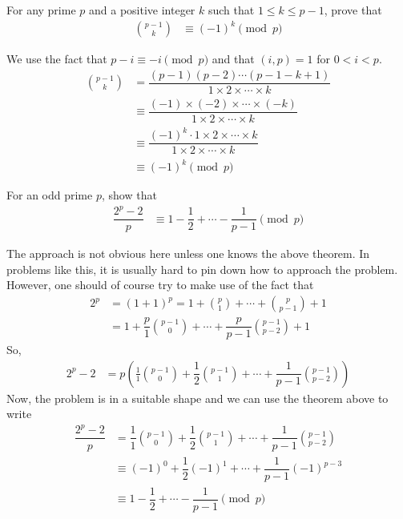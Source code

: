 \documentclass[12pt]{subfile}
\begin{document}
		\begin{problem}\label{prob:binom(p-1)(k)}
			For any prime $p$ and a positive integer $k$ such that $1 \leq k \leq p-1$, prove that
				\begin{align*}
					\binom{p-1}{k} & \equiv(-1)^k\pmod p
				\end{align*}
		\end{problem}

		\begin{solution}
			We use the fact that $p-i\equiv-i\pmod p$ and that $(i,p)=1$ for $0<i<p$.
				\begin{align*}
					\binom{p-1}{k}
						& = \dfrac{(p-1)(p-2)\cdots(p-1-k+1)}{1\times 2 \times \cdots \times k}\\
						& \equiv \dfrac{(-1) \times (-2) \times \cdots \times (-k)}{1\times 2 \times \cdots \times k}\\
						& \equiv\dfrac{(-1)^k \cdot 1\times 2 \times \cdots \times k}{1\times 2 \times \cdots \times k}\\
						& \equiv(-1)^k\pmod p
				\end{align*}

		\end{solution}

		\begin{problem}
			For an odd prime $p$, show that
				\begin{align*}
					\dfrac{2^p-2}{p} & \equiv1-\dfrac{1}{2}+\cdots-\dfrac{1}{p-1}\pmod p
				\end{align*}
		\end{problem}

		\begin{solution}
			The approach is not obvious here unless one knows the above theorem. In problems like this, it is usually hard to pin down how to approach the problem. However, one should of course try to make use of the fact that
				\begin{align*}
					2^p
						& = (1+1)^p = 1+\binom{p}{1}+\cdots+\binom{p}{p-1}+1\\
						& = 1+\dfrac{p}{1}\binom{p-1}{0}+\cdots+\dfrac{p}{p-1}\binom{p-1}{p-2}+1
				\end{align*}
			So,
				\begin{align*}
					2^p-2
						& = p\left(\frac{1}{1}\binom{p-1}{0}+\dfrac{1}{2}\binom{p-1}{1}+\cdots+\dfrac{1}{p-1}\binom{p-1}{p-2}\right)
				\end{align*}
			Now, the problem is in a suitable shape and we can use the theorem above to write
				\begin{align*}
					\dfrac{2^p-2}{p}
						& = \dfrac{1}{1}\binom{p-1}{0}+\dfrac{1}{2}\binom{p-1}{1}+\cdots+\dfrac{1}{p-1}\binom{p-1}{p-2}\\
						& \equiv(-1)^0+\dfrac{1}{2}(-1)^1+\cdots+\dfrac{1}{p-1}(-1)^{p-3}\\
						& \equiv1-\dfrac{1}{2}+\cdots-\dfrac{1}{p-1}\pmod p
				\end{align*}

		\end{solution}
\end{document}
